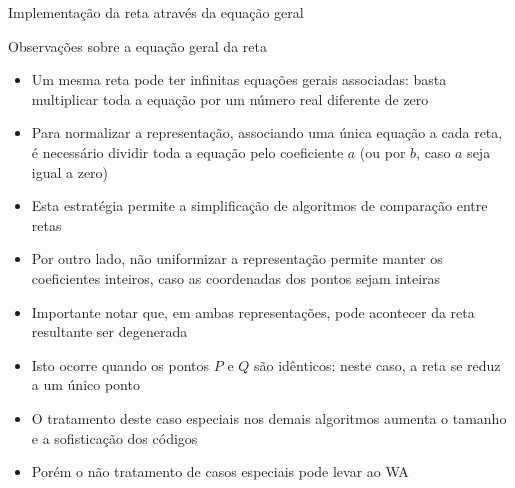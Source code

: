 \begin{frame}[fragile]{Implementação da reta através da equação geral}
\end{frame}

\begin{frame}[fragile]{Observações sobre a equação geral da reta}

    \begin{itemize}
        \item Um mesma reta pode ter infinitas equações gerais associadas: basta multiplicar toda a equação por um número real diferente de zero
        \pause

        \item Para normalizar a representação, associando uma única equação a cada reta, é necessário dividir toda a equação pelo coeficiente $a$ (ou por $b$, caso $a$ seja igual a zero)
        \pause

        \item Esta estratégia permite a simplificação de algoritmos de comparação entre retas
        \pause

        \item Por outro lado, não uniformizar a representação permite manter os coeficientes 
            inteiros, caso as coordenadas dos pontos sejam inteiras
        \pause

        \item Importante notar que, em ambas representações, pode acontecer da reta resultante ser degenerada
        \pause

        \item Isto ocorre quando os pontos $P$ e $Q$ são idênticos: neste caso, a reta se reduz a um único ponto 
        \pause

        \item O tratamento deste caso especiais nos demais algoritmos aumenta o tamanho e a sofisticação dos códigos
        \pause

        \item Porém o não tratamento de casos especiais pode levar ao WA
    \end{itemize}

\end{frame}

